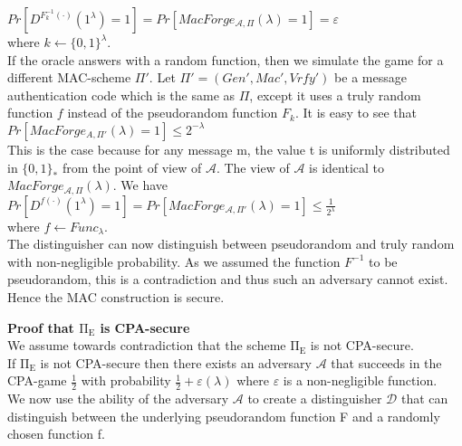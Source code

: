 $Pr\left [ D^{F_{k}^{-1}(\cdot )}(1^{\lambda }) = 1 \right ] = Pr\left [ MacForge_{\mathcal{A},\Pi}(\lambda ) = 1 \right ] = \varepsilon $\\

where $k \leftarrow  \{0,1\}^{\lambda }$.\\

If the oracle answers with a random function, then we simulate the game for a different MAC-scheme $\Pi'$.
Let $\Pi' = (Gen', Mac', Vrfy')$ be a message authentication code which is the same as $\Pi$, except it uses a truly random function $f$ instead of the pseudorandom function $F_{k}$. 
It is easy to see that \\

$Pr\left [ MacForge_{A,\Pi'}(\lambda ) = 1 \right ] \leq 2^{-\lambda } $\\

This is the case because for any message m, the value t is uniformly distributed in $\{0,1\}_{*}$ from the point of view of $\mathcal{A}$. The view of $\mathcal{A}$ is identical to $MacForge_{\mathcal{A},\Pi}(\lambda )$. We have \\
$Pr\left [ D^{f(\cdot )}(1^{\lambda }) = 1 \right ] = Pr\left [ MacForge_{\mathcal{A},\Pi'}(\lambda ) = 1 \right ]  \leq \frac{1}{2^{\lambda }} $ \\
where $f \leftarrow Func_{\lambda }$.\\

The distinguisher can now distinguish between pseudorandom and truly random with non-negligible probability.
As we assumed the function $F^{-1}$ to be pseudorandom, this is a contradiction and thus such an adversary cannot exist. Hence the MAC construction is secure.
\vskip 1cm


\noindent\textbf{Proof that $\mathrm{\Pi_{E}}$ is CPA-secure}\\
We assume towards contradiction that the scheme $\mathrm{\Pi_{E}}$ is not CPA-secure.\\

If $\mathrm{\Pi_{E}}$ is not CPA-secure then there exists an adversary $\mathcal{A}$ that succeeds in the CPA-game $\frac{1}{2}$ with probability $\frac{1}{2} + \varepsilon(\lambda )$ where $\varepsilon$ is a non-negligible function.\\

We now use the ability of the adversary $\mathcal{A}$ to create a distinguisher $\mathcal{D}$ that can distinguish between the underlying pseudorandom function F and a randomly chosen function f.\\

